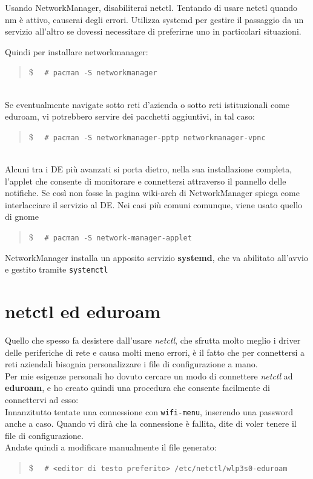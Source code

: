 \documentclass[twoside,italian]{book}
\newcommand{\code}[1]{\texttt{#1}}
\newcommand{\shellcode}[1]{\$$\quad$ \texttt{#1}}
\newcommand{\centcode}[1]{
	\begin{quote}
		\color{code}
		\shellcode{#1}
	\end{quote}
}
\newcommand{\nlinea}{
	\leavevmode
	\\
}
\begin{document}
			\begin{tcolorbox}[floatplacement=b,width=\textwidth,colback={blue},title={NOTA BENE:},colbacktitle=gray,coltitle=white,colupper=white]
				Usando NetworkManager, disabiliterai netctl. Tentando di usare netctl quando nm è attivo, causerai degli errori. Utilizza systemd per gestire il passaggio da un servizio all'altro se dovessi necessitare di preferirne uno in particolari situazioni.
			\end{tcolorbox}
		
			Quindi per installare networkmanager: \centcode{\# pacman -S networkmanager}
			\nlinea
			Se eventualmente navigate sotto reti d'azienda o sotto reti istituzionali come eduroam, vi potrebbero servire dei pacchetti aggiuntivi, in tal caso:
			\centcode{\# pacman -S networkmanager-pptp networkmanager-vpnc}
			\nlinea
			
			Alcuni tra i DE più avanzati si porta dietro, nella sua installazione completa, l'applet che consente di monitorare e connettersi attraverso il pannello delle notifiche. Se così non fosse la pagina wiki-arch di NetworkManager spiega come interlacciare il servizio al DE.
			Nei casi più comuni comunque, viene usato quello di gnome \centcode{\# pacman -S network-manager-applet}
			
			NetworkManager installa un apposito servizio \textbf{systemd}, che va abilitato all'avvio e gestito tramite \code{systemctl}
			
		\section{netctl ed eduroam}
			Quello che spesso fa desistere dall'usare \textit{netctl}, che sfrutta molto meglio i driver delle periferiche di rete e causa molti meno errori, è il fatto che per connettersi a reti aziendali bisognia personalizzare i file di configurazione a mano. \\
			Per mie esigenze personali ho dovuto cercare un modo di connettere \textit{netctl} ad \textbf{eduroam}, e ho creato quindi una procedura che consente facilmente di connettervi ad esso:\\
			Innanzitutto tentate una connessione con \code{wifi-menu}, inserendo una password anche a caso. Quando vi dirà che la connessione è fallita, dite di voler tenere il file di configurazione.\\
			Andate quindi a modificare manualmente il file generato:\centcode{\# <editor di testo preferito> /etc/netctl/wlp3s0-eduroam}
			
\end{document}
